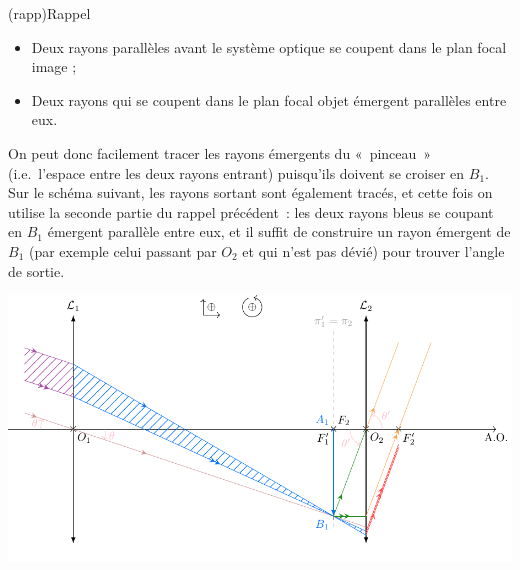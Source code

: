 \documentclass[../../main/main.tex]{subfiles}
\begin{document}
{	\begin{center}
		\begin{tcb}[width=\linewidth](rapp){Rappel}
			\begin{itemize}
				\item Deux rayons parallèles avant le système optique se coupent
				      dans le plan focal image ;
				\item Deux rayons qui se coupent dans le plan focal objet émergent
				      parallèles entre eux.
			\end{itemize}
		\end{tcb}
	\end{center}

	On peut donc facilement tracer les rayons émergents du «~pinceau~» (i.e.\
	l'espace entre les deux rayons entrant) puisqu'ils doivent se croiser en $B_1$.
	Sur le schéma suivant, les rayons sortant sont également tracés, et cette fois
	on utilise la seconde partie du rappel précédent~: les deux rayons bleus se
	coupant en $B_1$ émergent parallèle entre eux, et il suffit de construire un
	rayon émergent de $B_1$ (par exemple celui passant par $O_2$ et qui n'est pas
	dévié) pour trouver l'angle de sortie.

	\begin{center}
		\includegraphics{kepler.pdf}
	\end{center}

}
\end{document}
